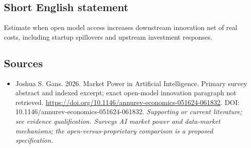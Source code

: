 \documentclass[11pt]{article}
\begin{document}
\subsection{Short English statement}
Estimate when open model access increases downstream innovation net of real costs, including startup spillovers and upstream investment responses.

\subsection{Sources}
\begin{itemize}\raggedright
\item[\textnormal{[S1]}]\hypertarget{source:30007699:1}{} Joshua S. Gans. 2026. Market Power in Artificial Intelligence. Primary survey abstract and indexed excerpt; exact open-model innovation paragraph not retrieved.
\url{https://doi.org/10.1146/annurev-economics-051624-061832}.
DOI: 10.1146/annurev-economics-051624-061832.
{\small\textit{Supporting or current literature; see evidence qualification. Surveys AI market power and data-market mechanisms; the open-versus-proprietary comparison is a proposed specification.}}
\end{itemize}
\end{document}
